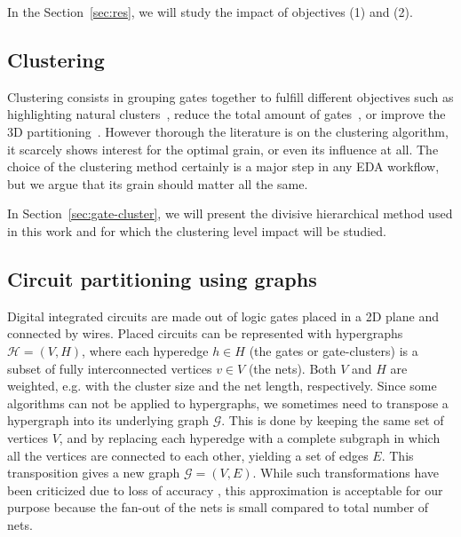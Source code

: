 \documentclass[conference]{IEEEtran}
\begin{document}

In the Section~\ref{sec:res}, we will study the impact of objectives (1) and (2).




\subsection{Clustering}\label{sec:clustering}
Clustering consists in grouping gates together to fulfill different objectives such as highlighting natural clusters~\cite{Li2006}, reduce the total amount of gates~\cite{Moura2017}, or improve the 3D partitioning~\cite{Han2016}.
However thorough the literature is on the clustering algorithm, it scarcely shows interest for the optimal grain, or even its influence at all.
The choice of the clustering method certainly is a major step in any EDA workflow, but we argue that its grain should matter all the same.

In Section~\ref{sec:gate-cluster}, we will present the divisive hierarchical method used in this work and for which the clustering level impact will be studied.


\subsection{Circuit partitioning using graphs}\label{sec:partitioning}
Digital integrated circuits are made out of logic gates placed in a 2D plane and connected by wires. Placed circuits can be represented with hypergraphs $\mathcal{H} = (V, H)$, where each hyperedge $h \in H$ (the gates or gate-clusters) is a subset of fully interconnected vertices $v \in V$ (the nets).
Both $V$ and $H$ are weighted, e.g. with the cluster size and the net length, respectively. 
Since some algorithms can not be applied to hypergraphs, we sometimes need to transpose a hypergraph into its underlying graph $\mathcal{G}$.
This is done by keeping the same set of vertices $V$, and by replacing each hyperedge with a complete subgraph in which all the vertices are connected to each other, yielding a set of edges $E$.
This transposition gives a new graph $\mathcal{G} = (V, E)$. While such transformations have been criticized  due to loss of accuracy \cite{IhlerEdmund;WagnerDorothea;Wagner1993}, this approximation is acceptable for our purpose because the fan-out of the nets is small compared to total number of nets.
\end{document}

